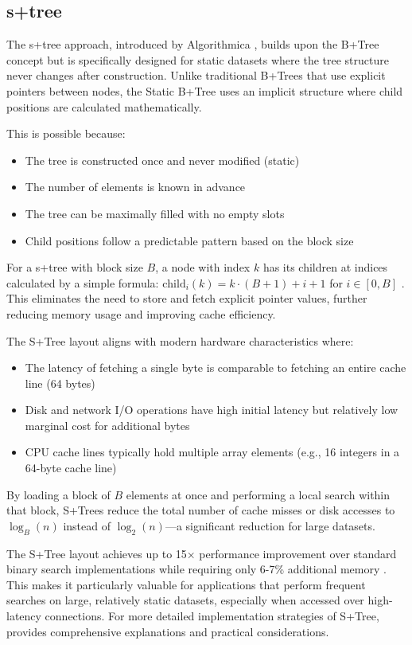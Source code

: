 \subsection{\texorpdfstring{\ac{s+tree}}{S+tree}}
\label{tb:stree}

The \ac{s+tree} approach, introduced by Algorithmica \citep{static_b_trees}, builds upon the B+Tree concept but is specifically designed for static datasets where the tree structure never changes after construction. Unlike traditional B+Trees that use explicit pointers between nodes, the Static B+Tree uses an implicit structure where child positions are calculated mathematically.

This is possible because:
\begin{itemize}
  \item The tree is constructed once and never modified (static)
  \item The number of elements is known in advance
  \item The tree can be maximally filled with no empty slots
  \item Child positions follow a predictable pattern based on the block size
\end{itemize}

For a \ac{s+tree} with block size $B$, a node with index $k$ has its children at indices calculated by a simple formula: $\text{child}_i(k) = k \cdot (B+1) + i + 1$ for $i \in [0, B]$ \citep{static_b_trees}. This eliminates the need to store and fetch explicit pointer values, further reducing memory usage and improving cache efficiency.

The S+Tree layout aligns with modern hardware characteristics where:
\begin{itemize}
  \item The latency of fetching a single byte is comparable to fetching an entire cache line (64 bytes)
  \item Disk and network I/O operations have high initial latency but relatively low marginal cost for additional bytes
  \item CPU cache lines typically hold multiple array elements (e.g., 16 integers in a 64-byte cache line)
\end{itemize}

By loading a block of $B$ elements at once and performing a local search within that block, S+Trees reduce the total number of cache misses or disk accesses to $\log_B(n)$ instead of $\log_2(n)$—a significant reduction for large datasets.

The S+Tree layout achieves up to 15× performance improvement over standard binary search implementations while requiring only 6-7\% additional memory \citep{static_b_trees}. This makes it particularly valuable for applications that perform frequent searches on large, relatively static datasets, especially when accessed over high-latency connections. For more detailed implementation strategies of S+Tree, \citet{koerkamp_2024} provides comprehensive explanations and practical considerations.